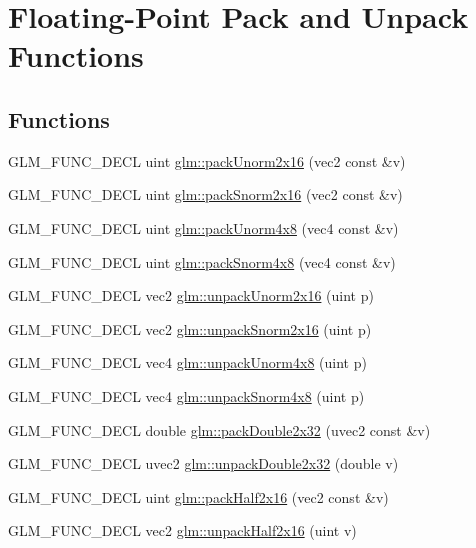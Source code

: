 \hypertarget{group__core__func__packing}{\section{Floating-\/\-Point Pack and Unpack Functions}
\label{group__core__func__packing}
}
\subsection*{Functions}
\begin{DoxyCompactItemize}
\item 
G\-L\-M\-\_\-\-F\-U\-N\-C\-\_\-\-D\-E\-C\-L uint \hyperlink{group__core__func__packing_ga0659ddaf09727551c7bf51655d2a65cf}{glm\-::pack\-Unorm2x16} (vec2 const \&v)
\item 
G\-L\-M\-\_\-\-F\-U\-N\-C\-\_\-\-D\-E\-C\-L uint \hyperlink{group__core__func__packing_ga0c8005de240d6c4ca3d16c7bee25c622}{glm\-::pack\-Snorm2x16} (vec2 const \&v)
\item 
G\-L\-M\-\_\-\-F\-U\-N\-C\-\_\-\-D\-E\-C\-L uint \hyperlink{group__core__func__packing_ga834ee9a9e73dcb0a7c1fc88143f3edb8}{glm\-::pack\-Unorm4x8} (vec4 const \&v)
\item 
G\-L\-M\-\_\-\-F\-U\-N\-C\-\_\-\-D\-E\-C\-L uint \hyperlink{group__core__func__packing_gafcf25acc0d361c6c696a433aa5dfd16b}{glm\-::pack\-Snorm4x8} (vec4 const \&v)
\item 
G\-L\-M\-\_\-\-F\-U\-N\-C\-\_\-\-D\-E\-C\-L vec2 \hyperlink{group__core__func__packing_ga11776a74e1885a14e1295d6e917a9ae2}{glm\-::unpack\-Unorm2x16} (uint p)
\item 
G\-L\-M\-\_\-\-F\-U\-N\-C\-\_\-\-D\-E\-C\-L vec2 \hyperlink{group__core__func__packing_gae5f30f599243df9525315edecae09a7f}{glm\-::unpack\-Snorm2x16} (uint p)
\item 
G\-L\-M\-\_\-\-F\-U\-N\-C\-\_\-\-D\-E\-C\-L vec4 \hyperlink{group__core__func__packing_ga1ec646af4b27982d175672bddd642792}{glm\-::unpack\-Unorm4x8} (uint p)
\item 
G\-L\-M\-\_\-\-F\-U\-N\-C\-\_\-\-D\-E\-C\-L vec4 \hyperlink{group__core__func__packing_ga4b18a0480e7260401d97f40cacd6bc36}{glm\-::unpack\-Snorm4x8} (uint p)
\item 
G\-L\-M\-\_\-\-F\-U\-N\-C\-\_\-\-D\-E\-C\-L double \hyperlink{group__core__func__packing_gaf728fdfb98ce34da6f968d9f6bf154d7}{glm\-::pack\-Double2x32} (uvec2 const \&v)
\item 
G\-L\-M\-\_\-\-F\-U\-N\-C\-\_\-\-D\-E\-C\-L uvec2 \hyperlink{group__core__func__packing_gaea67aa4d065175e7746b2a8a2d00cedb}{glm\-::unpack\-Double2x32} (double v)
\item 
G\-L\-M\-\_\-\-F\-U\-N\-C\-\_\-\-D\-E\-C\-L uint \hyperlink{group__core__func__packing_ga082f6dd65f73a547ed3067ef00be036f}{glm\-::pack\-Half2x16} (vec2 const \&v)
\item 
G\-L\-M\-\_\-\-F\-U\-N\-C\-\_\-\-D\-E\-C\-L vec2 \hyperlink{group__core__func__packing_ga90be544929ed83fa7039208bbab8c0ba}{glm\-::unpack\-Half2x16} (uint v)
\end{DoxyCompactItemize}


